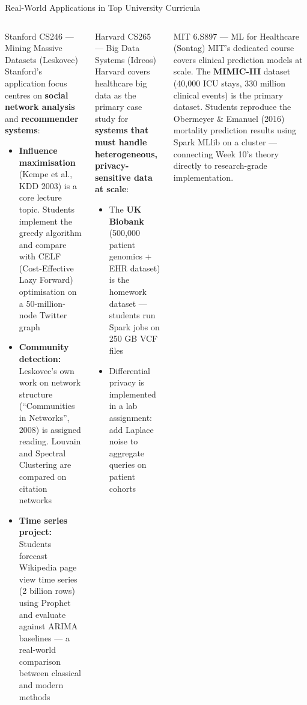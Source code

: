 \documentclass[aspectratio=169,10pt]{beamer}
\begin{document}
\begin{frame}{Real-World Applications in Top University Curricula}
  \begin{columns}[T]
      \begin{block}{Stanford CS246 — Mining Massive Datasets (Leskovec)}
        \small Stanford's application focus centres on \textbf{social network analysis} and \textbf{recommender systems}:
        \begin{itemize}
          \item \textbf{Influence maximisation} (Kempe et al., KDD 2003) is a core lecture topic.  Students implement the greedy algorithm and compare with CELF (Cost-Effective Lazy Forward) optimisation on a 50-million-node Twitter graph
          \item \textbf{Community detection:} Leskovec's own work on network structure (``Communities in Networks'', 2008) is assigned reading.  Louvain and Spectral Clustering are compared on citation networks
          \item \textbf{Time series project:} Students forecast Wikipedia page view time series (2 billion rows) using Prophet and evaluate against ARIMA baselines --- a real-world comparison between classical and modern methods
        \end{itemize}
      \end{block}

      \begin{exampleblock}{Harvard CS265 — Big Data Systems (Idreos)}
        \small Harvard covers healthcare big data as the primary case study for \textbf{systems that must handle heterogeneous, privacy-sensitive data at scale}:
        \begin{itemize}
          \item The \textbf{UK Biobank} (500{,}000 patient genomics + EHR dataset) is the homework dataset --- students run Spark jobs on 250 GB VCF files
          \item Differential privacy is implemented in a lab assignment: add Laplace noise to aggregate queries on patient cohorts
        \end{itemize}
      \end{exampleblock}
      \vspace{4pt}
      \begin{alertblock}{MIT 6.S897 — ML for Healthcare (Sontag)}
        \small MIT's dedicated course covers clinical prediction models at scale.  The \textbf{MIMIC-III} dataset (40{,}000 ICU stays, 330 million clinical events) is the primary dataset.  Students reproduce the Obermeyer \& Emanuel (2016) mortality prediction results using Spark MLlib on a cluster --- connecting Week 10's theory directly to research-grade implementation.
      \end{alertblock}
  \end{columns}
\end{frame}
\end{document}
